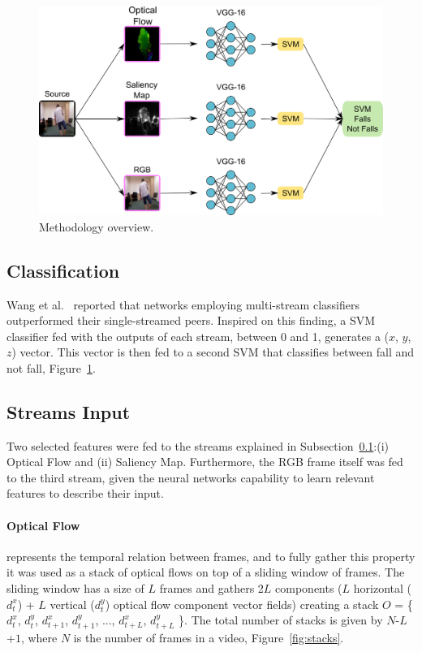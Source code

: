 \documentclass[conference]{IEEEtran}
\begin{document}
\begin{figure}[htbp]
\centerline{\includegraphics[width=\linewidth]{figures/overview.png}}
\caption{Methodology overview.}
\label{fig:pos14}
\end{figure}

\subsection{Classification}
\label{sec:classification}

Wang et al.~\cite{wang2015towards} reported that networks employing multi-stream classifiers outperformed their single-streamed peers. Inspired on this finding, a SVM classifier fed with the outputs of each stream, between 0 and 1, generates a ($x$, $y$, $z$) vector. This vector is then fed to a second SVM that classifies between fall and not fall, Figure~\ref{fig:pos14}.

\subsection{Streams Input}

Two selected features were fed to the streams explained in Subsection~\ref{sec:classification}:(i) Optical Flow and (ii) Saliency Map. Furthermore, the RGB frame itself was fed to the third stream, given the neural networks capability to learn relevant features to describe their input.

\paragraph{Optical Flow} represents the temporal relation between frames, and to fully gather this property it was used as a stack of optical flows on top of a sliding window of frames. The sliding window has a size of $L$ frames and gathers 2$L$ components ($L$ horizontal ($d_t^x$) + $L$ vertical ($d_t^y$) optical flow component vector fields) creating a stack $O$ = \{$d_t^x$, $d_t^y$, $d_{t+1}^x$, $d_{t+1}^y$, ..., $d_{t+L}^x$, $d_{t+L}^y$ \}. The total number of stacks is given by $N$-$L$+$1$, where $N$ is the number of frames in a video, Figure~\ref{fig:stacks}. 
\end{document}
